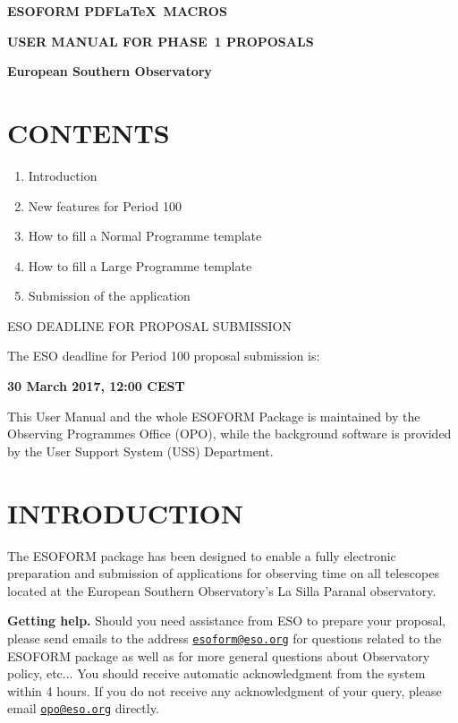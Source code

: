 \documentclass{article}
\begin{document}
\centerline{{\Large{\bf ESOFORM PDF\LaTeX\ MACROS}}}
\bigskip
\centerline{{\Large{\bf USER MANUAL FOR PHASE~1 PROPOSALS }}}
\bigskip
\centerline{{\bf European Southern Observatory }}
\vspace{3cm}

\def\period{100}

\section*{CONTENTS} 

\begin{enumerate}  
\item Introduction 
\item New features for Period 100
\item How to fill a Normal Programme template 
\item How to fill a Large  Programme template 
\item Submission of the application 
\end{enumerate} 

\vspace{3.0truecm}

\centerline{\large ESO DEADLINE FOR PROPOSAL SUBMISSION }
\medskip
\centerline{The ESO deadline for Period 100 proposal submission is:}
\medskip
\centerline{\huge \bf 30 March 2017, 12:00 CEST}

\vfill

\noindent This User Manual and the whole ESOFORM Package is
maintained by the Observing Programmes Office (OPO),
while the background software
is provided by the User Support System (USS) Department.

\break

\section{INTRODUCTION}

The ESOFORM package has been designed to enable a fully
electronic preparation and submission of applications for observing
time on all telescopes located at the European Southern Observatory's
La Silla Paranal observatory.

{\bf Getting help.} Should you need assistance from ESO to prepare
your proposal, please send emails to the address
\href{mailto:esoform@eso.org}{\tt esoform@eso.org} for questions
related to the ESOFORM package as well as for more general questions
about Observatory policy, etc...
You should receive automatic acknowledgment from the system within 
4 hours. If you do not receive any acknowledgment of your query, 
please email 
\href{mailto:opo@eso.org}{\tt opo@eso.org} directly.
\end{document}
